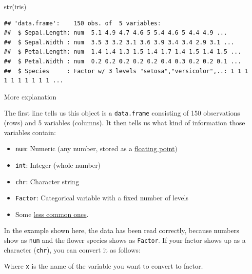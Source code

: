 \documentclass[
]{book}
\newenvironment{Shaded}{\begin{snugshade}}{\end{snugshade}}
\newcommand{\FunctionTok}[1]{\textcolor[rgb]{0.00,0.00,0.00}{#1}}
\newcommand{\NormalTok}[1]{#1}
\newcommand{\OtherTok}[1]{\textcolor[rgb]{0.56,0.35,0.01}{#1}}
\newcommand{\SpecialCharTok}[1]{\textcolor[rgb]{0.00,0.00,0.00}{#1}}
\providecommand{\tightlist}{%
  \setlength{\itemsep}{0pt}\setlength{\parskip}{0pt}}
\begin{document}
\begin{Shaded}
\begin{Highlighting}[]
\FunctionTok{str}\NormalTok{(iris)}
\end{Highlighting}
\end{Shaded}

\begin{verbatim}
## 'data.frame':    150 obs. of  5 variables:
##  $ Sepal.Length: num  5.1 4.9 4.7 4.6 5 5.4 4.6 5 4.4 4.9 ...
##  $ Sepal.Width : num  3.5 3 3.2 3.1 3.6 3.9 3.4 3.4 2.9 3.1 ...
##  $ Petal.Length: num  1.4 1.4 1.3 1.5 1.4 1.7 1.4 1.5 1.4 1.5 ...
##  $ Petal.Width : num  0.2 0.2 0.2 0.2 0.2 0.4 0.3 0.2 0.2 0.1 ...
##  $ Species     : Factor w/ 3 levels "setosa","versicolor",..: 1 1 1 1 1 1 1 1 1 1 ...
\end{verbatim}

More explanation

The first line tells us this object is a \texttt{data.frame} consisting of 150 observations (rows) and 5 variables (columns). It then tells us what kind of information those variables contain:

\begin{itemize}
\tightlist
\item
  \texttt{num}: Numeric (any number, stored as a \href{https://youtu.be/L8OYx1I8qNg}{floating point})
\item
  \texttt{int}: Integer (whole number)
\item
  \texttt{chr}: Character string
\item
  \texttt{Factor}: Categorical variable with a fixed number of levels
\item
  Some \href{https://adv-r.hadley.nz/vectors-chap.html\#s3-atomic-vectors}{less common ones}.
\end{itemize}

In the example shown here, the data has been read correctly, because numbers show as \texttt{num} and the flower species shows as \texttt{Factor}. If your factor shows up as a character (\texttt{chr}), you can convert it as follows:

\begin{Shaded}
\end{Shaded}

Where \texttt{x} is the name of the variable you want to convert to factor.
\end{document}
